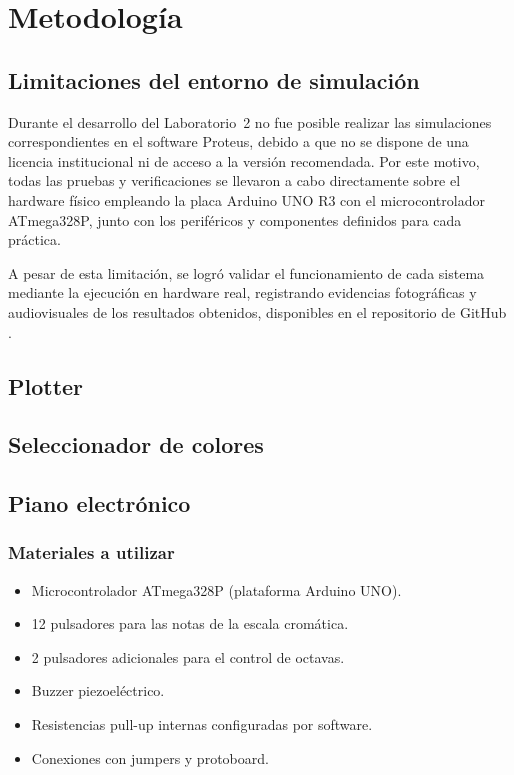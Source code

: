 \vspace{0.8cm}

\section{Metodología}

\subsection{Limitaciones del entorno de simulación}

Durante el desarrollo del Laboratorio~2 no fue posible realizar las simulaciones correspondientes en el software Proteus, debido a que no se dispone de una licencia institucional ni de acceso a la versión recomendada. Por este motivo, todas las pruebas y verificaciones se llevaron a cabo directamente sobre el hardware físico empleando la placa Arduino UNO R3 con el microcontrolador ATmega328P, junto con los periféricos y componentes definidos para cada práctica.

A pesar de esta limitación, se logró validar el funcionamiento de cada sistema mediante la ejecución en hardware real, registrando evidencias fotográficas y audiovisuales de los resultados obtenidos, disponibles en el repositorio de GitHub \cite{github_evidencias_lab2}.

\subsection{Plotter}

\subsection{Seleccionador de colores}

\subsection{Piano electrónico}

\subsubsection{Materiales a utilizar}
\begin{itemize}
    \item Microcontrolador ATmega328P (plataforma Arduino UNO).
    \item 12 pulsadores para las notas de la escala cromática.
    \item 2 pulsadores adicionales para el control de octavas.
    \item Buzzer piezoeléctrico.
    \item Resistencias pull-up internas configuradas por software.
    \item Conexiones con jumpers y protoboard.
\end{itemize}

